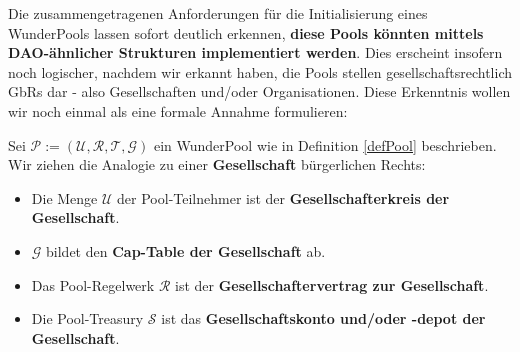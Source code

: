 \vspace{0.3cm}

Die zusammengetragenen Anforderungen für die Initialisierung eines WunderPools lassen sofort deutlich erkennen, \textbf{diese Pools könnten mittels DAO-ähnlicher Strukturen implementiert werden}. Dies erscheint insofern noch logischer, nachdem wir erkannt haben, die Pools stellen gesellschaftsrechtlich GbRs dar - also Gesellschaften und/oder Organisationen. Diese Erkenntnis wollen wir noch einmal als eine formale Annahme formulieren: 

\vspace{0.2cm}

\begin{Assumption}
\label{assumptionGbR} 

Sei $\mathcal{P} := \left( \mathcal{U}, \mathcal{R}, \mathcal{T}, \mathcal{G} \right)$ ein WunderPool wie in Definition \ref{defPool} beschrieben. Wir ziehen die Analogie zu einer \textbf{Gesellschaft} bürgerlichen Rechts:

\begin{itemize}
	\item Die Menge $\mathcal{U}$ der Pool-Teilnehmer ist der \textbf{Gesellschafterkreis der Gesellschaft}.
	\item $\mathcal{G}$ bildet den \textbf{Cap-Table der Gesellschaft} ab.
	\item Das Pool-Regelwerk $\mathcal{R}$ ist der \textbf{Gesellschaftervertrag zur Gesellschaft}.
	\item Die Pool-Treasury $\mathcal{S}$ ist das \textbf{Gesellschaftskonto und/oder -depot der Gesellschaft}.
\end{itemize}

\end{Assumption}
 
\vspace{0.5cm}